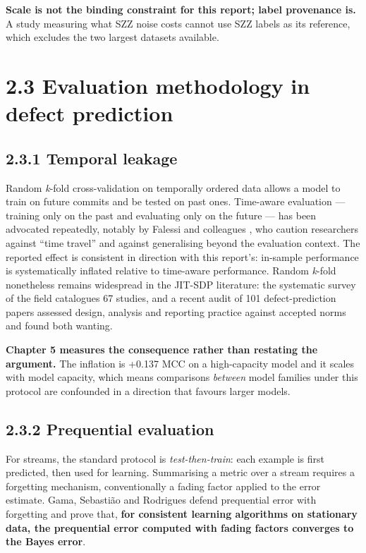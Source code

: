 \textbf{Scale is not the binding constraint for this report; label
provenance is.} A study measuring what SZZ noise costs cannot use SZZ
labels as its reference, which excludes the two largest datasets
available.

\section{2.3 Evaluation methodology in defect
prediction}\label{evaluation-methodology-in-defect-prediction}

\subsection{2.3.1 Temporal leakage}\label{temporal-leakage}

Random \emph{k}-fold cross-validation on temporally ordered data allows
a model to train on future commits and be tested on past ones.
Time-aware evaluation --- training only on the past and evaluating only
on the future --- has been advocated repeatedly, notably by Falessi and
colleagues \citep{falessi2020timetravel}, who caution researchers
against ``time travel'' and against generalising beyond the evaluation
context. The reported effect is consistent in direction with this
report's: in-sample performance is systematically inflated relative to
time-aware performance. Random \emph{k}-fold nonetheless remains
widespread in the JIT-SDP literature: the systematic survey of the field
\citep{zhao2023survey} catalogues 67 studies, and a recent audit of 101
defect-prediction papers \citep{destefanis2026audit} assessed design,
analysis and reporting practice against accepted norms and found both
wanting.

\textbf{Chapter 5 measures the consequence rather than restating the
argument.} The inflation is +0.137 MCC on a high-capacity model and it
scales with model capacity, which means comparisons \emph{between} model
families under this protocol are confounded in a direction that favours
larger models.

\subsection{2.3.2 Prequential evaluation}\label{prequential-evaluation}

For streams, the standard protocol is \emph{test-then-train}: each
example is first predicted, then used for learning. Summarising a metric
over a stream requires a forgetting mechanism, conventionally a fading
factor applied to the error estimate. Gama, Sebasti\~{a}o and Rodrigues
\citep{gama2013prequential} defend prequential error with forgetting and
prove that, \textbf{for consistent learning algorithms on stationary
data, the prequential error computed with fading factors converges to
the Bayes error}.

